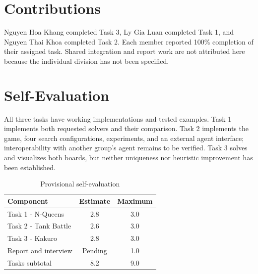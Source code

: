 \documentclass[conference]{IEEEtran}
\begin{document}
\section{Contributions}
Nguyen Hoa Khang completed Task 3, Ly Gia Luan completed Task 1, and Nguyen Thai Khoa completed Task 2. Each member reported 100\% completion of their assigned task. Shared integration and report work are not attributed here because the individual division has not been specified.
\section{Self-Evaluation}
All three tasks have working implementations and tested examples. Task 1 implements both requested solvers and their comparison. Task 2 implements the game, four search configurations, experiments, and an external agent interface; interoperability with another group's agent remains to be verified. Task 3 solves and visualizes both boards, but neither uniqueness nor heuristic improvement has been established.
\begin{table}[htbp]\caption{Provisional self-evaluation}\label{selfeval}\centering
    \begin{tabular}{lcc}\hline Component & Estimate & Maximum \\\hline
                   Task 1 - N-Queens     & 2.8      & 3.0     \\
                   Task 2 - Tank Battle  & 2.6      & 3.0     \\
                   Task 3 - Kakuro       & 2.8      & 3.0     \\
                   Report and interview  & Pending  & 1.0     \\\hline
                   Tasks subtotal        & 8.2      & 9.0    \\\hline\end{tabular}\end{table}
\end{document}
